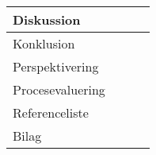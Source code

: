 \begin{table}[h!]
\begin{tabular}{|p{40mm}|p{25mm}|p{25mm}|p{25mm}|}
        Diskussion             &                  &          &  \\ \hline
        Konklusion             &                  &          &  \\ \hline
        Perspektivering        &                  &          &  \\ \hline
        Procesevaluering       &                  &          &  \\ \hline
        Referenceliste         &                  &          &  \\ \hline
        Bilag                  &                  &          &  \\ \hline
    \end{tabular}
\end{table}

\clearpage
